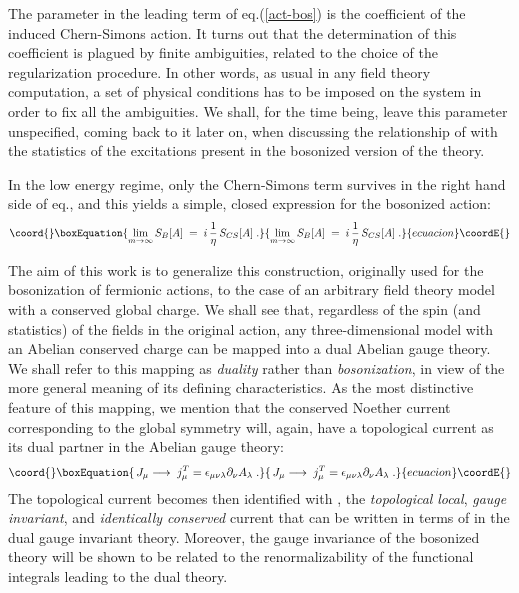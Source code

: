 \documentclass[a4paper,12pt]{article}
\begin{document}
The parameter \myHighlight{$\eta$}\coordHE{} in the leading term of eq.(\ref{act-bos}) is the
coefficient of the induced Chern-Simons action. It turns out that the
determination of this coefficient is plagued by finite ambiguities,
related to the choice of the regularization procedure. In other words,
as usual in any field theory computation, a set of physical conditions
has to be imposed on the system in order to fix all the ambiguities. We
shall, for the time being, leave this parameter unspecified, coming
back to it later on, when discussing the relationship of \myHighlight{$\eta$}\coordHE{} with
the statistics of the excitations present in the bosonized version of
the theory.

In the low energy regime, only the Chern-Simons term survives in the
right hand side of eq.\myHighlight{$\left( {\rm{\ref{act-bos}}}\right) $}\coordHE{}, and this
yields a simple, closed expression for the bosonized action:
\begin{equation}\coord{}\boxEquation{
 \label{m-inf}
\lim_{m\to \infty }S_B[A]\;=\; i \,\frac{1}{\eta} \,S_{CS}[A]\;.
}{
 \lim_{m\to \infty }S_B[A]\;=\; i \,\frac{1}{\eta} \,S_{CS}[A]\;.
}{ecuacion}\coordE{}\end{equation}

The aim of this work is to generalize this construction, originally
used for the bosonization of fermionic actions, to the case of an
arbitrary field theory model with a conserved global \coordHE{} charge. We
shall see that, regardless of the spin (and statistics) of the fields
in the original action, any three-dimensional model with an Abelian
conserved charge can be mapped into a dual Abelian gauge theory.  We
shall refer to this mapping as {\em duality\/} rather than {\em
bosonization}, in view of the more general meaning of its defining
characteristics.  As the most distinctive feature of this mapping, we
mention that the conserved Noether current \coordHE{} corresponding to the
\coordHE{} global symmetry will, again, have a topological current
\coordHE{} as its dual partner in the Abelian gauge theory:
\begin{equation}\coord{}\boxEquation{
\label{u1-curr}
\,J_\mu \longrightarrow \;j_\mu^T =\epsilon_{\mu \nu \lambda}\partial_\nu A_\lambda \;.
}{
\,J_\mu \longrightarrow \;j_\mu^T =\epsilon_{\mu \nu \lambda}\partial_\nu A_\lambda \;.
}{ecuacion}\coordE{}\end{equation}
The topological current \coordHE{} becomes then identified with \coordHE{}, the {\em topological} {\em local}, {\em gauge invariant}, and
{\em identically conserved\/} current that can be written in terms of
\coordHE{} in the dual gauge invariant theory. Moreover, the gauge
invariance of the bosonized theory will be shown to be related to the
renormalizability of the functional integrals leading to the dual
theory.
\end{document}
